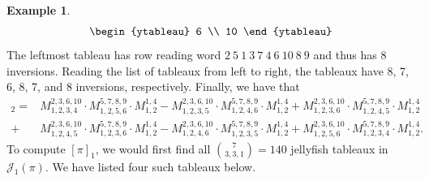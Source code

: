 \documentclass[10pt]{amsart}
\theoremstyle{definition}
\theoremstyle{plain}
\theoremstyle{plain}
\theoremstyle{definition}
\newtheorem{example}[cdrthm]{Example}
\theoremstyle{remark}
\theoremstyle{plain}
\theoremstyle{plain}
\theoremstyle{plain}
\numberwithin{equation}{section}
\newcommand{\rstab}{\mathcal{J}}
\begin{document}
\begin{example}
\[\begin{ytableau}
6 \\
10
\end{ytableau}\]
The leftmost tableau has row reading word $2~5~1~3~7~4~6~10~8~9$ and thus has 8 inversions. Reading the list of tableaux from left to right, the tableaux have 8, 7, 6, 8, 7, and 8 inversions, respectively. Finally, we have that 
{\small 
\begin{align*}[\pi]_2 = &M_{1,2,3,4}^{2,3,6,10}\cdot M_{1,2,5,6}^{5,7,8,9}\cdot M_{1,2}^{1,4}
- M_{1,2,3,5}^{2,3,6,10}\cdot M_{1,2,4,6}^{5,7,8,9}\cdot M_{1,2}^{1,4}
+ M_{1,2,3,6}^{2,3,6,10}\cdot M_{1,2,4,5}^{5,7,8,9}\cdot M_{1,2}^{1,4}\\
+ &M_{1,2,4,5}^{2,3,6,10}\cdot M_{1,2,3,6}^{5,7,8,9}\cdot M_{1,2}^{1,4}
- M_{1,2,4,6}^{2,3,6,10}\cdot M_{1,2,3,5}^{5,7,8,9}\cdot M_{1,2}^{1,4}
+ M_{1,2,5,6}^{2,3,6,10}\cdot M_{1,2,3,4}^{5,7,8,9}\cdot M_{1,2}^{1,4}.
\end{align*}
}
To compute $[\pi]_1$, we would first find all $\binom{7}{3,3,1}=140$ jellyfish tableaux in $\rstab_1(\pi)$. We have listed four such tableaux below. 



\end{example}
\end{document}
